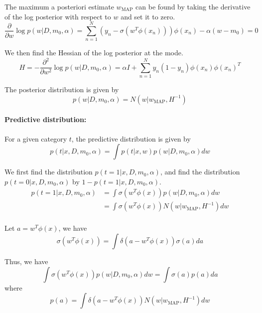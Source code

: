 \documentclass[a4paper,12pt]{article}
\newcommand{\pard}[2]{\frac{\partial #1}{\partial #2}}
\begin{document}
The maximum a posteriori estimate $w_\text{MAP}$ can be found by taking the derivative of the log posterior with respect to $w$ and set it to zero.
\begin{equation*}
	\pard{}{w} \log p(w|D, m_0, \alpha) = \sum_{n=1}^{N} (y_n - \sigma(w^T \phi(x_n))) \phi(x_n) - \alpha (w - m_0) = 0
\end{equation*}

We then find the Hessian of the log posterior at the mode.
\begin{equation*}
	H = - \frac{\partial^2}{\partial w^2} \log p(w|D, m_0, \alpha) = \alpha I + \sum_{n=1}^{N} y_n (1 - y_n) \phi(x_n) \phi(x_n)^T
\end{equation*}

The posterior distribution is given by
\begin{equation*}
	p(w|D, m_0, \alpha) = N(w|w_\text{MAP}, H^{-1})
\end{equation*}

\paragraph{Predictive distribution:}
For a given category $t$, the predictive distribution is given by
\begin{equation*}
	p(t|x, D, m_0, \alpha) = \int p(t|x, w) p(w|D, m_0, \alpha) dw
\end{equation*}

We first find the distribution $p(t = 1|x, D, m_0, \alpha)$, and find the distribution $p(t = 0|x, D, m_0, \alpha)$ by $1 - p(t = 1|x, D, m_0, \alpha)$.
\begin{align*}
	p(t = 1|x, D, m_0, \alpha) &= \int \sigma(w^T \phi(x)) p(w|D, m_0, \alpha) dw \\
	&= \int \sigma(w^T \phi(x)) N(w|w_\text{MAP}, H^{-1}) dw \\
\end{align*}

Let $a = w^T \phi(x)$, we have
\begin{equation*}
	\sigma(w^T \phi(x)) = \int \delta(a - w^T \phi(x)) \sigma(a) da
\end{equation*}

Thus, we have
\begin{equation*}
	\int \sigma(w^T \phi(x)) p(w|D, m_0, \alpha) dw = \int \sigma(a) p(a) da
\end{equation*}
where
\begin{equation*}
	p(a) = \int \delta(a - w^T \phi(x)) N(w|w_\text{MAP}, H^{-1}) dw
\end{equation*}
\end{document}
